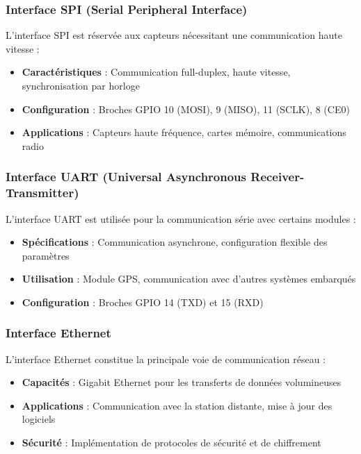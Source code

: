 {\subsubsection{Interface SPI (Serial Peripheral Interface)}
L'interface SPI est réservée aux capteurs nécessitant une communication haute vitesse :
\begin{itemize}
    \setlength{\itemsep}{.375em}
    \item \textbf{Caractéristiques} : Communication full-duplex, haute vitesse, synchronisation par horloge
    \item \textbf{Configuration} : Broches GPIO 10 (MOSI), 9 (MISO), 11 (SCLK), 8 (CE0)
    \item \textbf{Applications} : Capteurs haute fréquence, cartes mémoire, communications radio
\end{itemize}

\subsubsection{Interface UART (Universal Asynchronous Receiver-Transmitter)}
L'interface UART est utilisée pour la communication série avec certains modules :
\begin{itemize}
    \item \textbf{Spécifications} : Communication asynchrone, configuration flexible des paramètres
    \item \textbf{Utilisation} : Module GPS, communication avec d'autres systèmes embarqués
    \item \textbf{Configuration} : Broches GPIO 14 (TXD) et 15 (RXD)
\end{itemize}

\subsubsection{Interface Ethernet}
L'interface Ethernet constitue la principale voie de communication réseau :
\begin{itemize}
    \item \textbf{Capacités} : Gigabit Ethernet pour les transferts de données volumineuses
    \item \textbf{Applications} : Communication avec la station distante, mise à jour des logiciels
    \item \textbf{Sécurité} : Implémentation de protocoles de sécurité et de chiffrement
\end{itemize}

}
